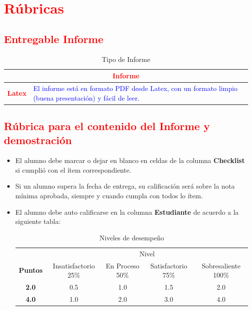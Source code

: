 \documentclass{article}
\begin{document}
\section{\textcolor{red}{Rúbricas}}
	
\subsection{\textcolor{red}{Entregable Informe}}
	\begin{table}[H]
		\caption{Tipo de Informe}
		\setlength{\tabcolsep}{0.5em} %
		{\renewcommand{\arraystretch}{1.5} %
		\begin{tabular}{|p{3cm}|p{12cm}|}
			\hline
			\multicolumn{2}{|c|}{\textbf{\textcolor{red}{Informe}}}  \\
			\hline 
			\textbf{\textcolor{red}{Latex}} & \textcolor{blue}{El informe está en formato PDF desde Latex,  con un formato limpio (buena presentación) y fácil de leer.}   \\ 
			\hline 
		\end{tabular}
	}
	\end{table}
	
\clearpage

 
\subsection{\textcolor{red}{Rúbrica para el contenido del Informe y demostración}}
\begin{itemize}			
	\item El alumno debe marcar o dejar en blanco en celdas de la columna \textbf{Checklist} si cumplió con el ítem correspondiente.
	\item Si un alumno supera la fecha de entrega,  su calificación será sobre la nota mínima aprobada, siempre y cuando cumpla con todos lo ítem.
	\item El alumno debe auto calificarse en la columna \textbf{Estudiante} de acuerdo a la siguiente tabla:
	
    \begin{table}[ht]
    	\caption{Niveles de desempeño}
    	\begin{center}
    		\begin{tabular}{ccccc}
        	\hline
        	& \multicolumn{4}{c}{Nivel}\\
        	\cline{1-5}
        	\textbf{Puntos} & Insatisfactorio 25\%& En Proceso 50\% & Satisfactorio 75\% & Sobresaliente 100\%\\
        	\textbf{2.0}&0.5&1.0&1.5&2.0\\
        	\textbf{4.0}&1.0&2.0&3.0&4.0\\
        	\hline
    		\end{tabular}
    	\end{center}
    \end{table}	
\end{itemize}
\end{document}
